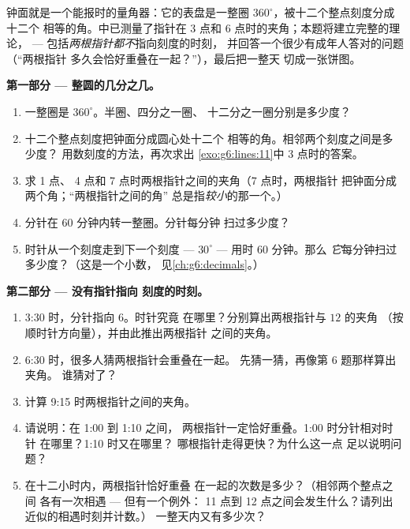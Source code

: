 \begin{problem}
\label{pb:g6:lines:1}
钟面就是一个能报时的量角器：它的表盘是一整圈
$360^\circ$，被十二个整点刻度分成十二个
相等的角。中已测量了指针在
3 点和 6 点时的夹角；本题将建立完整的理论，
--- 包括\emph{两根指针都不}指向刻度的时刻，
并回答一个很少有成年人答对的问题（“两根指针
多久会恰好重叠在一起？”），最后把一整天
切成一张饼图。

\medskip
\noindent\textbf{第一部分 --- 整圆的几分之几。}
\begin{enumerate}
  \item 一整圈是 $360^\circ$。半圈、四分之一圈、
        十二分之一圈分别是多少度？
  \item 十二个整点刻度把钟面分成圆心处十二个
        相等的角。相邻两个刻度之间是多少度？
        用数刻度的方法，再次求出
        \cref{exo:g6:lines:11}中 3 点时的答案。
  \item 求 1 点、
        4 点和 7 点时两根指针之间的夹角（7 点时，两根指针
        把钟面分成两个角；“两根指针之间的角”
        总是指\emph{较小}的那一个。）
  \item 分针在 $60$ 分钟内转一整圈。分针每分钟
        扫过多少度？
  \item 时针从一个刻度走到下一个刻度 ---
        $30^\circ$ --- 用时 $60$ 分钟。那么
        \emph{它}每分钟扫过多少度？（这是一个小数，
        见\cref{ch:g6:decimals}。）
\end{enumerate}

\medskip
\noindent\textbf{第二部分 --- 没有指针指向
刻度的时刻。}
\begin{enumerate}[resume]
  \item 3:30 时，分针指向 $6$。时针究竟
        在哪里？分别算出两根指针与 $12$ 的夹角
        （按顺时针方向量），并由此推出两根指针
        之间的夹角。
  \item 6:30 时，很多人猜两根指针会重叠在一起。
        先猜一猜，再像第 6 题那样算出夹角。
        谁猜对了？
  \item 计算 9:15 时两根指针之间的夹角。
  \item 请说明：在 1:00 到 1:10 之间，
        两根指针一定恰好重叠。1:00 时分针相对时针
        在哪里？1:10 时又在哪里？
        哪根指针走得更快？为什么这一点
        足以说明问题？
  \item 在十二小时内，两根指针恰好重叠
        在一起的次数是多少？（相邻两个整点之间
        各有一次相遇 --- 但有一个例外：
        11 点到 12 点之间会发生什么？请列出
        近似的相遇时刻并计数。）
        一整天内又有多少次？
\end{enumerate}


\end{problem}
